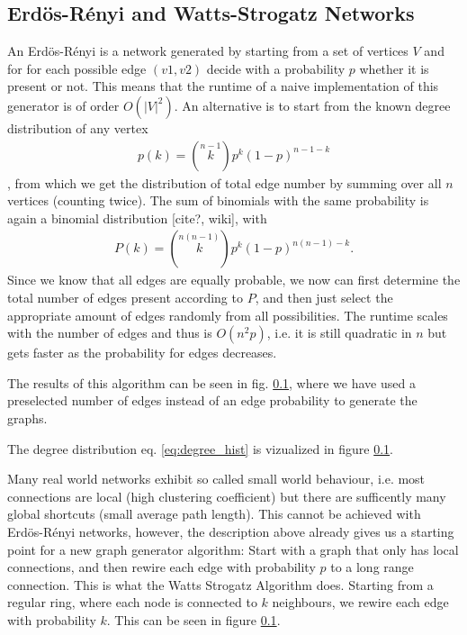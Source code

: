 \documentclass{scrartcl}
\begin{document}
\subsection{Erdös-Rényi and Watts-Strogatz Networks}
An Erdös-Rényi is a network generated by starting from a set of vertices $V$ and for for each possible edge $(v1, v2)$ decide with a probability $p$ whether it is present or not. This means that the runtime of a naive implementation of this generator is of order $O(|V|^2)$. An alternative is to start from the known degree distribution of any vertex 
\begin{align}
p(k) = \left( \stackrel{n-1}{k} \right) p^k (1-p)^{n-1-k} \label{eq:degree_hist}
\end{align}, from which we get the distribution of total edge number by summing over all $n$ vertices (counting twice). The sum of binomials with the same probability is again a binomial distribution [cite?, wiki], with
\begin{align}
P(k) = \left( \stackrel{n(n-1) }{k} \right) p^k (1-p)^{n(n-1)-k}.
\end{align}
Since we know that all edges are equally probable, we now can first determine the total number of edges present according to $P$, and then just select the appropriate amount of edges randomly from all possibilities. The runtime scales with the number of edges and thus is $O(n^2 p)$, i.e. it is still quadratic in $n$ but gets faster as the probability for edges decreases.

The results of this algorithm can be seen in fig. \ref{}, where we have used a preselected number of edges instead of an edge probability to generate the graphs.

The degree distribution eq. \eqref{eq:degree_hist} is vizualized in figure \ref{}.

Many real world networks exhibit so called small world behaviour, i.e. most connections are local (high clustering coefficient) but there are sufficently many global shortcuts (small average path length). This cannot be achieved with Erdös-Rényi networks, however, the description above already gives us a starting point for a new graph generator algorithm: Start with a graph that only has local connections, and then rewire each edge with probability $p$ to a long range connection. This is what the Watts Strogatz Algorithm does. Starting from a regular ring, where each node is connected to $k$ neighbours, we rewire each edge with probability $k$. This can be seen in figure \ref{}.
\end{document}
